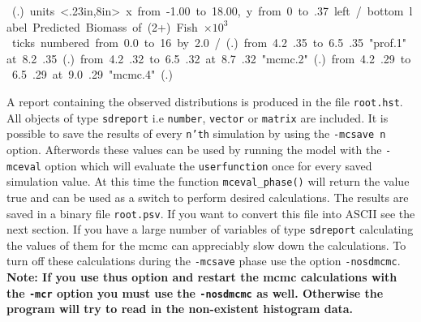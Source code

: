 \documentclass[12pt]{book}
\begin{document}
\htmlbeginignore
\vbox{
\medskip
\quad\hbox{
\htmlendignore
\beginpicture
  \setplotsymbol ({\eightrm .})
  \setcoordinatesystem units <.23in,8in>
  \setplotarea x from -1.00 to 18.00, y from 0 to .37 
  \axis left 
  /
  \axis bottom label {Predicted Biomass of (2+) Fish
    $\times 10^3$} ticks
    numbered from 0.0 to 16 by 2.0 
  /
  \setplotsymbol ({\rmmedium .})
\setdashpattern <2pt,2pt,2pt,3pt>
 \putrule from 4.2 .35 to 6.5 .35
 \plot  "prof.1" 
  at 8.2 .35
  \setplotsymbol ({\eightrm .})
\setdashpattern <1pt,3pt,4pt,3pt>
 \putrule from 4.2 .32 to 6.5 .32
  at 8.7 .32
 \plot  "mcmc.2" 
\setdashpattern <1pt,1pt,1pt,1pt>
  \setplotsymbol ({\tenrm .})
 \putrule from 4.2 .29 to 6.5 .29
  at 9.0 .29
 \plot  "mcmc.4" 
  \setplotsymbol ({\rmmedium .})
\setdashpattern <1pt,3pt,4pt,3pt>
\endpicture
\htmlbeginignore
\hfill
}}
\htmlendignore

A report containing the observed distributions is produced in the file
{\tt root.hst}. All objects of type {\tt sdreport} i.e {\tt number}, 
{\tt vector} or {\tt matrix} are included. 
It is possible to save the results of every {\tt n'th} simulation by
using the {\tt -mcsave n} option.  Afterwords these values can be used by
running the model with the {\tt -mceval} option which will evaluate the 
{\tt userfunction} once for every saved simulation value. At this time
the function {\tt mceval\_phase()} will return the value true and can be
used as a switch to perform desired calculations. The results are saved in a
binary file {\tt root.psv}. If you want to convert this file into
ASCII see the next section. If you have a large number of variables of
type {\tt sdreport} calculating the values of them for the mcmc can
appreciably slow down the calculations. To turn off these
calculations during the {\tt -mcsave} phase use the option
{\tt -nosdmcmc}. {\bf Note: If you use thus option and restart the
mcmc calculations with the {\tt -mcr} option you must use the
{\tt -nosdmcmc} as well. Otherwise the program will try to read in the
non-existent histogram data.}
\end{document}
